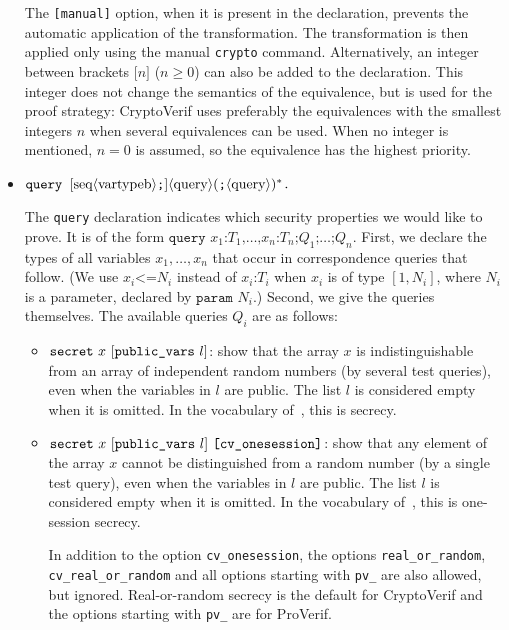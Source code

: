 \begin{itemize}
The \texttt{[manual]} option, when it is present in the declaration,
prevents the automatic application of the transformation. The transformation
is then applied only using the manual \texttt{crypto} command.
Alternatively, an integer between brackets $\texttt{[}n\texttt{]}$ ($n \geq 0$)
can also be added to the declaration.
This integer does not change the semantics of the equivalence, but is
used for the proof strategy: CryptoVerif uses preferably the equivalences
with the smallest integers $n$ when several equivalences can be used.
When no integer is mentioned,
$n = 0$ is assumed, so the equivalence has the highest priority.


\item $\texttt{query }[\textrm{seq}\langle\textrm{vartypeb}\rangle\texttt{;}]\langle\textrm{query}\rangle(\texttt{;}\langle\textrm{query}\rangle)^* \texttt{.}$

The {\tt query} declaration indicates which security properties we 
would like to prove. It is of the form $\texttt{query }x_1\texttt{:}T_1\texttt{,} \ldots\texttt{,} x_n\texttt{:}T_n\texttt{;} Q_1\texttt{;} \dots\texttt{;}Q_n$. First, we declare the types of all variables $x_1, \ldots, x_n$
that occur in correspondence queries that follow. (We use $x_i \texttt{<=} N_i$ instead of
  $x_i\texttt{:} T_i$ when $x_i$ is of type $[1,N_i]$, where $N_i$ is
  a parameter, declared by $\texttt{param }N_i$.) Second, we give the queries themselves. The available queries $Q_i$ are as follows:
\begin{itemize}

\item ${\tt secret}\ x\ [\texttt{public\_vars}\ l]$: show that the array $x$ is indistinguishable
from an array of independent random numbers (by several test queries),
even when the variables in $l$ are public. The list $l$ is considered empty when it is omitted.
In the vocabulary of~\cite{BlanchetEPrint05}, this is secrecy.

\item ${\tt secret}\ x\ [\texttt{public\_vars}\ l]\ \texttt{[cv\_onesession]}$: 
show that any element of the array $x$ 
cannot be distinguished from a random number (by a single test query),
even when the variables in $l$ are public. The list $l$ is considered empty when it is omitted.
In the vocabulary of~\cite{BlanchetEPrint05}, this is one-session
secrecy.

In addition to the option \texttt{cv\_onesession}, the options \texttt{real\_or\_random},
\texttt{cv\_real\_or\_random} and all options starting with \texttt{pv\_} are also allowed,
but ignored. Real-or-random secrecy is the default for CryptoVerif and
the options starting with \texttt{pv\_} are for ProVerif.


\end{itemize}
\end{itemize}
